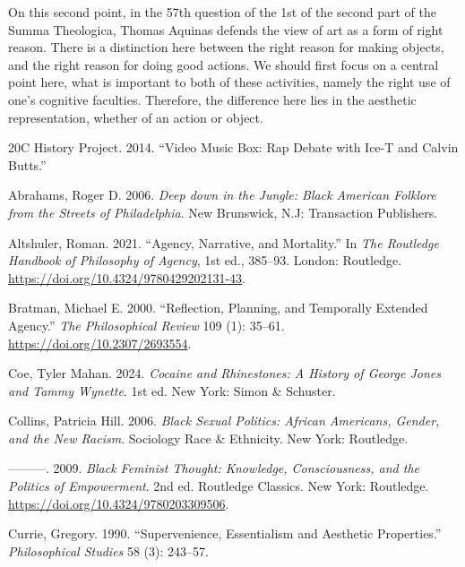 \documentclass[
  letterpaper,
  DIV=11,
  numbers=noendperiod]{scrreprt}
\newlength{\cslhangindent}
\newenvironment{CSLReferences}[2] %
 {\begin{list}{}{%
  \setlength{\itemindent}{0pt}
  \setlength{\leftmargin}{0pt}
  \setlength{\parsep}{0pt}
  \ifodd #1
   \setlength{\leftmargin}{\cslhangindent}
   \setlength{\itemindent}{-1\cslhangindent}
  \fi
  \setlength{\itemsep}{#2\baselineskip}}}
 {\end{list}}
\begin{document}
\begin{tcolorbox}[enhanced jigsaw, arc=.35mm, breakable, rightrule=.15mm, colback=white, colframe=quarto-callout-important-color-frame, bottomrule=.15mm, leftrule=.75mm, opacityback=0, toprule=.15mm, left=2mm]
\begin{tcolorbox}[enhanced jigsaw, arc=.35mm, breakable, rightrule=.15mm, colback=white, colframe=quarto-callout-tip-color-frame, bottomrule=.15mm, leftrule=.75mm, opacityback=0, toprule=.15mm, left=2mm]
On this second point, in the 57th question of the 1st of the second part
of the Summa Theologica, Thomas Aquinas defends the view of art as a
form of right reason. There is a distinction here between the right
reason for making objects, and the right reason for doing good actions.
We should first focus on a central point here, what is important to both
of these activities, namely the right use of one's cognitive faculties.
Therefore, the difference here lies in the aesthetic representation,
whether of an action or object.

\label{refs}
\begin{CSLReferences}{1}{0}
20C History Project. 2014. {``Video {Music Box}: {Rap Debate} with
{Ice-T} and {Calvin Butts}.''}

Abrahams, Roger D. 2006. \emph{Deep down in the {Jungle}: {Black
American Folklore} from the {Streets} of {Philadelphia}}. New Brunswick,
N.J: Transaction Publishers.

Altshuler, Roman. 2021. {``Agency, {Narrative}, and {Mortality}.''} In
\emph{The {Routledge Handbook} of {Philosophy} of {Agency}}, 1st ed.,
385--93. London: Routledge.
\url{https://doi.org/10.4324/9780429202131-43}.

Bratman, Michael E. 2000. {``Reflection, {Planning}, and {Temporally
Extended Agency}.''} \emph{The Philosophical Review} 109 (1): 35--61.
\url{https://doi.org/10.2307/2693554}.

Coe, Tyler Mahan. 2024. \emph{Cocaine and {Rhinestones}: {A History} of
{George Jones} and {Tammy Wynette}}. 1st ed. New York: Simon \&
Schuster.

Collins, Patricia Hill. 2006. \emph{Black {Sexual Politics}: {African
Americans}, {Gender}, and the {New Racism}}. Sociology {Race} \&
{Ethnicity}. New York: Routledge.

---------. 2009. \emph{Black {Feminist Thought}: {Knowledge},
{Consciousness}, and the {Politics} of {Empowerment}}. 2nd ed. Routledge
{Classics}. New York: Routledge.
\url{https://doi.org/10.4324/9780203309506}.

Currie, Gregory. 1990. {``Supervenience, {Essentialism} and {Aesthetic
Properties}.''} \emph{Philosophical Studies} 58 (3): 243--57.


\end{CSLReferences}
\end{tcolorbox}
\end{tcolorbox}
\end{document}
